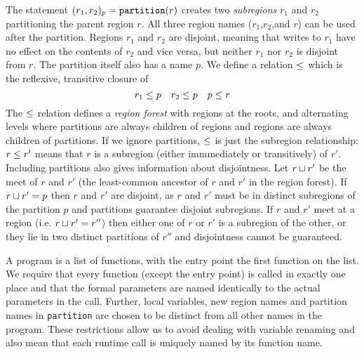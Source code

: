 The statement $(r_1, r_2)_{p} = \mbox{\tt partition}(r)$ creates two
{\em subregions} $r_1$ and $r_2$ partitioning the parent region $r$.
All three region names ($r_1$,$r_2$,and $r$) can be used after the
partition.  Regions $r_1$ and $r_2$ are disjoint, meaning that writes
to $r_1$ have no effect on the contents of $r_2$ and vice versa, but
neither $r_1$ nor $r_2$ is disjoint from $r$.  The partition itself
also has a name $p$.  We define a relation $\leq$ which is the
reflexive, transitive closure of
\[ r_1 \leq p \ \ \ r_2 \leq p \ \ \ p \leq r \]
The $\leq$ relation defines a {\em region forest} with regions at the
roots, and alternating levels where partitions are always children of
regions and regions are always children of partitions.  If we ignore
partitions, $\leq$ is just the subregion relationship: $r \leq r'$
means that $r$ is a subregion (either immmediately or transitively) of
$r'$.  Including partitions also gives information about disjointness.
Let $r \sqcup r'$ be the meet of $r$ and $r'$ (the least-common
ancestor of $r$ and $r'$ in the region forest).  If 
$r \sqcup r' = p$ then $r$ and $r'$ are disjoint, as $r$ and $r'$ must
be in distinct subregions of the partition $p$ and partitions
guarantee disjoint subregions.  If $r$ and $r'$ meet at a region (i.e. $r \sqcup r' = r''$) then either one of $r$ or $r'$ is a subregion of the other, or they
lie in two distinct partitions of $r''$ and disjointness cannot be guaranteed.


A program is a list of functions, with the entry point the first
function on the list.  We require that every function (except
the entry point) is called in exactly one place and that the formal
parameters are named identically to the actual parameters in the
call.  Further, local variables, new region names and
partition names in {\tt partition} are chosen to be distinct from all
other names in the program.  These restrictions allow us to avoid
dealing with variable renaming and also mean that each runtime call is
uniquely named by its function name.  

